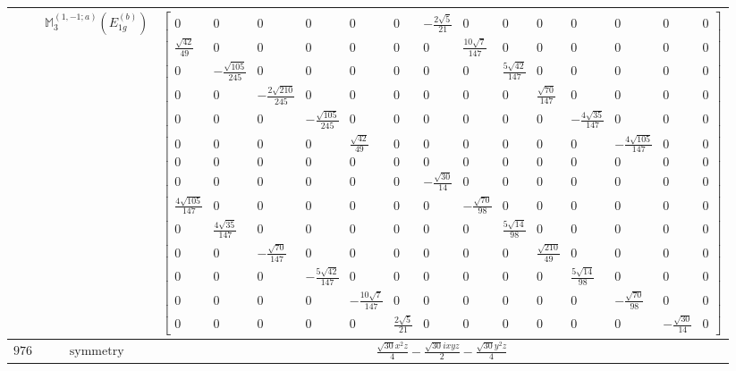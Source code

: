 \documentclass[fleqn,8pt,landscape]{jsarticle}
\begin{document}
\begin{longtable}{ccc}
$  $ & $ \mathbb{M}_{3}^{(1,-1;a)}(E_{1g}^{(b)}) $ & $ \begin{bmatrix} 0 & 0 & 0 & 0 & 0 & 0 & - \frac{2 \sqrt{5}}{21} & 0 & 0 & 0 & 0 & 0 & 0 & 0 \\ \frac{\sqrt{42}}{49} & 0 & 0 & 0 & 0 & 0 & 0 & \frac{10 \sqrt{7}}{147} & 0 & 0 & 0 & 0 & 0 & 0 \\ 0 & - \frac{\sqrt{105}}{245} & 0 & 0 & 0 & 0 & 0 & 0 & \frac{5 \sqrt{42}}{147} & 0 & 0 & 0 & 0 & 0 \\ 0 & 0 & - \frac{2 \sqrt{210}}{245} & 0 & 0 & 0 & 0 & 0 & 0 & \frac{\sqrt{70}}{147} & 0 & 0 & 0 & 0 \\ 0 & 0 & 0 & - \frac{\sqrt{105}}{245} & 0 & 0 & 0 & 0 & 0 & 0 & - \frac{4 \sqrt{35}}{147} & 0 & 0 & 0 \\ 0 & 0 & 0 & 0 & \frac{\sqrt{42}}{49} & 0 & 0 & 0 & 0 & 0 & 0 & - \frac{4 \sqrt{105}}{147} & 0 & 0 \\ 0 & 0 & 0 & 0 & 0 & 0 & 0 & 0 & 0 & 0 & 0 & 0 & 0 & 0 \\ 0 & 0 & 0 & 0 & 0 & 0 & - \frac{\sqrt{30}}{14} & 0 & 0 & 0 & 0 & 0 & 0 & 0 \\ \frac{4 \sqrt{105}}{147} & 0 & 0 & 0 & 0 & 0 & 0 & - \frac{\sqrt{70}}{98} & 0 & 0 & 0 & 0 & 0 & 0 \\ 0 & \frac{4 \sqrt{35}}{147} & 0 & 0 & 0 & 0 & 0 & 0 & \frac{5 \sqrt{14}}{98} & 0 & 0 & 0 & 0 & 0 \\ 0 & 0 & - \frac{\sqrt{70}}{147} & 0 & 0 & 0 & 0 & 0 & 0 & \frac{\sqrt{210}}{49} & 0 & 0 & 0 & 0 \\ 0 & 0 & 0 & - \frac{5 \sqrt{42}}{147} & 0 & 0 & 0 & 0 & 0 & 0 & \frac{5 \sqrt{14}}{98} & 0 & 0 & 0 \\ 0 & 0 & 0 & 0 & - \frac{10 \sqrt{7}}{147} & 0 & 0 & 0 & 0 & 0 & 0 & - \frac{\sqrt{70}}{98} & 0 & 0 \\ 0 & 0 & 0 & 0 & 0 & \frac{2 \sqrt{5}}{21} & 0 & 0 & 0 & 0 & 0 & 0 & - \frac{\sqrt{30}}{14} & 0 \end{bmatrix} $ \\ \hline
$ 976 $ & $ \text{symmetry} $ & $ \frac{\sqrt{30} x^{2} z}{4} - \frac{\sqrt{30} i x y z}{2} - \frac{\sqrt{30} y^{2} z}{4} $ \\

\end{longtable}
\end{document}
